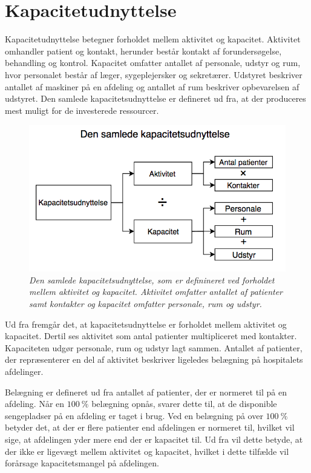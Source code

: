 \section{Kapacitetudnyttelse}
Kapacitetudnyttelse betegner forholdet mellem aktivitet og kapacitet. Aktivitet omhandler patient og kontakt, herunder består kontakt af forundersøgelse, behandling og kontrol. Kapacitet omfatter antallet af personale, udstyr og rum, hvor personalet består af læger, sygeplejersker og sekretærer. Udstyret beskriver antallet af maskiner på en afdeling og antallet af rum beskriver opbevarelsen af udstyret. Den samlede kapacitetsudnyttelse er defineret ud fra, at der produceres mest muligt for de investerede ressourcer.\cite{Company2013} 

\begin{figure}[H]
	\flushleft 
	\centering
	\includegraphics[scale=.5]{figures/Kapacitetsudnyttelse.png}
	\flushleft
	\caption{\textit{Den samlede kapacitetsudnyttelse, som er definineret ved forholdet mellem aktivitet og kapacitet. Aktivitet omfatter antallet af patienter samt kontakter og kapacitet omfatter personale, rum og udstyr.}\cite{Company2013}}
	\label{kapacitet}
\end{figure}

\noindent
Ud fra  fremgår det, at kapacitetsudnyttelse er forholdet mellem aktivitet og kapacitet. Dertil ses aktivitet som antal patienter multipliceret med kontakter. Kapaciteten udgør personale, rum og udstyr lagt sammen. Antallet af patienter, der repræsenterer en del af aktivitet beskriver ligeledes belægning på hospitalets afdelinger.\cite{Company2013} 

Belægning er defineret ud fra antallet af patienter, der er normeret til på en afdeling\cite{Heidmann2014}. Når en $100~\%$ belægning opnås, svarer dette til, at de disponible sengepladser på en afdeling er taget i brug. Ved en belægning på over $100~\%$ betyder det, at der er flere patienter end afdelingen er normeret til, hvilket vil sige, at afdelingen yder mere end der er kapacitet til. Ud fra  vil dette betyde, at der ikke er ligevægt mellem aktivitet og kapacitet, hvilket i dette tilfælde vil forårsage kapacitetsmangel på afdelingen. 


